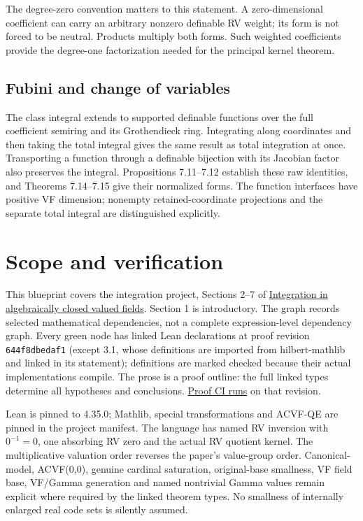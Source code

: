 The degree-zero convention matters to this statement. A zero-dimensional
coefficient can carry an arbitrary nonzero definable RV weight; its form is
not forced to be neutral. Products multiply both forms. Such weighted
coefficients provide the degree-one factorization needed for the principal
kernel theorem.

\subsection{Fubini and change of variables}
The class integral extends to supported definable functions over the full
coefficient semiring and its Grothendieck ring. Integrating along coordinates
and then taking the total integral gives the same result as total integration
at once. Transporting a function through a definable bijection with its
Jacobian factor also preserves the integral. Propositions 7.11--7.12 establish
these raw identities, and Theorems 7.14--7.15 give their normalized forms.
The function interfaces have positive VF dimension; nonempty retained-coordinate
projections and the separate total integral are distinguished explicitly.

\section{Scope and verification}
This blueprint covers the integration project, Sections 2--7 of
\href{https://arxiv.org/abs/0809.0473v2}{Integration in algebraically closed valued fields}.
Section 1 is introductory. The graph records selected mathematical dependencies,
not a complete expression-level dependency graph. Every green node has linked
Lean declarations at proof revision \texttt{644f8dbedaf1} (except 3.1, whose definitions are
imported from hilbert-mathlib and linked in its statement); definitions are
marked checked because their actual implementations compile. The prose is a
proof outline: the full linked types determine all hypotheses and conclusions.
\href{https://github.com/daviddhilbert/integration-in-ACVF/actions/workflows/lean.yml}{Proof CI runs} on that revision.

Lean is pinned to 4.35.0; Mathlib, special transformations and ACVF-QE are pinned
in the project manifest. The language has named RV inversion with $0^{-1}=0$,
one absorbing RV zero and the actual RV quotient kernel. The multiplicative
valuation order reverses the paper's value-group order. Canonical-model,
ACVF(0,0), genuine cardinal saturation, original-base smallness, VF field base,
VF/Gamma generation and named nontrivial Gamma values remain explicit where
required by the linked theorem types. No smallness of internally enlarged
real code sets is silently assumed.

